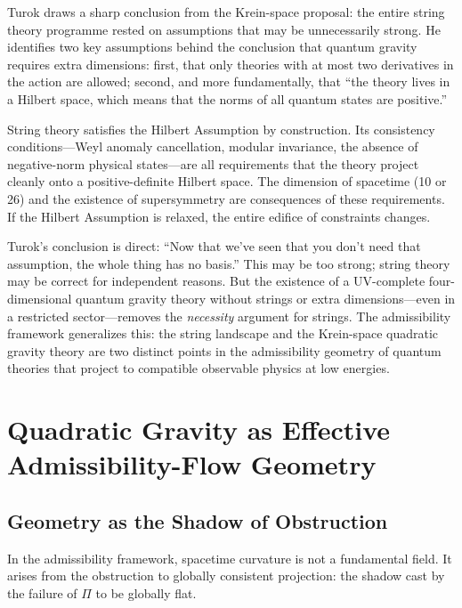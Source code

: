 \documentclass[12pt,a4paper]{article}
\theoremstyle{remark}
\begin{document}
Turok draws a sharp conclusion from the Krein-space proposal: the entire
string theory programme rested on assumptions that may be unnecessarily
strong. He identifies two key assumptions behind the conclusion that quantum
gravity requires extra dimensions: first, that only theories with at most
two derivatives in the action are allowed; second, and more fundamentally,
that ``the theory lives in a Hilbert space, which means that the norms of
all quantum states are positive.''

String theory satisfies the Hilbert Assumption by construction. Its
consistency conditions---Weyl anomaly cancellation, modular invariance,
the absence of negative-norm physical states---are all requirements that
the theory project cleanly onto a positive-definite Hilbert space. The
dimension of spacetime (10 or 26) and the existence of supersymmetry are
consequences of these requirements. If the Hilbert Assumption is relaxed,
the entire edifice of constraints changes.

Turok's conclusion is direct: ``Now that we've seen that you don't need
that assumption, the whole thing has no basis.'' This may be too strong;
string theory may be correct for independent reasons. But the existence
of a UV-complete four-dimensional quantum gravity theory without strings
or extra dimensions---even in a restricted sector---removes the
\emph{necessity} argument for strings. The admissibility framework
generalizes this: the string landscape and the Krein-space quadratic
gravity theory are two distinct points in the admissibility geometry of
quantum theories that project to compatible observable physics at low
energies.


\section{Quadratic Gravity as Effective Admissibility-Flow Geometry}

\subsection{Geometry as the Shadow of Obstruction}

In the admissibility framework, spacetime curvature is not a fundamental
field. It arises from the obstruction to globally consistent projection:
the shadow cast by the failure of $\Pi$ to be globally flat.
\end{document}
